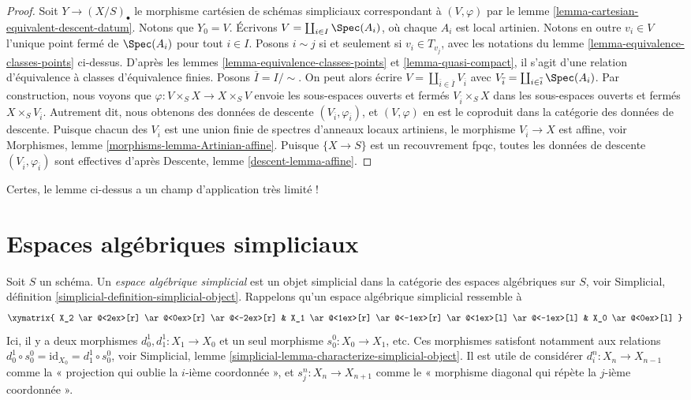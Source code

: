 \begin{proof}
Soit $Y \to (X/S)_\bullet$ le morphisme cartésien de schémas simpliciaux
correspondant à $(V, \varphi)$ par
le lemme \ref{lemma-cartesian-equivalent-descent-datum}.
Notons que $Y_0 = V$.
Écrivons $V = \coprod_{i \in I} \Spec(A_i)$, où chaque $A_i$ est local
artinien. Notons en outre $v_i \in V$ l'unique point fermé de
$\Spec(A_i)$ pour tout $i \in I$. Posons $i \sim j$ si et seulement si
$v_i \in T_{v_j}$, avec les notations du
lemme \ref{lemma-equivalence-classes-points} ci-dessus.
D'après les lemmes \ref{lemma-equivalence-classes-points} et \ref{lemma-quasi-compact},
il s'agit d'une relation d'équivalence à classes d'équivalence finies.
Posons $\overline{I} = I/\sim$. On peut alors écrire
$V = \coprod_{\overline{i} \in \overline{I}} V_{\overline{i}}$
avec
$V_{\overline{i}} = \coprod_{i \in \overline{i}} \Spec(A_i)$.
Par construction, nous voyons que
$\varphi : V \times_S X \to X \times_S V$ envoie
les sous-espaces ouverts et fermés $V_{\overline{i}} \times_S X$
dans les sous-espaces ouverts et fermés $X \times_S V_{\overline{i}}$.
Autrement dit, nous obtenons des données de descente
$(V_{\overline{i}}, \varphi_{\overline{i}})$, et
$(V, \varphi)$ en est le coproduit dans la catégorie des
données de descente.
Puisque chacun des $V_{\overline{i}}$ est une union finie de spectres
d'anneaux locaux artiniens, le morphisme $V_{\overline{i}} \to X$
est affine, voir Morphismes, lemme \ref{morphisms-lemma-Artinian-affine}.
Puisque $\{X \to S\}$ est un recouvrement fpqc, toutes les
données de descente $(V_{\overline{i}}, \varphi_{\overline{i}})$ sont effectives
d'après Descente, lemme \ref{descent-lemma-affine}.
\end{proof}

\noindent
Certes, le lemme ci-dessus a un champ d'application très limité !









\section{Espaces algébriques simpliciaux}
\label{section-simplicial-algebraic-spaces}

\noindent
Soit $S$ un schéma. Un {\it espace algébrique simplicial}
est un objet simplicial dans la catégorie des espaces algébriques sur $S$,
voir Simplicial, définition \ref{simplicial-definition-simplicial-object}.
Rappelons qu'un espace algébrique simplicial ressemble à
$$
\xymatrix{
X_2
\ar@<2ex>[r]
\ar@<0ex>[r]
\ar@<-2ex>[r]
&
X_1
\ar@<1ex>[r]
\ar@<-1ex>[r]
\ar@<1ex>[l]
\ar@<-1ex>[l]
&
X_0
\ar@<0ex>[l]
}
$$
Ici, il y a deux morphismes $d^1_0, d^1_1 : X_1 \to X_0$
et un seul morphisme $s^0_0 : X_0 \to X_1$, etc.
Ces morphismes satisfont notamment aux relations
$d^1_0 \circ s^0_0 = \text{id}_{X_0} = d^1_1 \circ s^0_0$, voir
Simplicial, lemme \ref{simplicial-lemma-characterize-simplicial-object}.
Il est utile de considérer $d^n_i : X_n \to X_{n - 1}$
comme la « projection qui oublie la $i$-ième coordonnée », et
$s^n_j : X_n \to X_{n + 1}$ comme le « morphisme diagonal qui répète
la $j$-ième coordonnée ».

